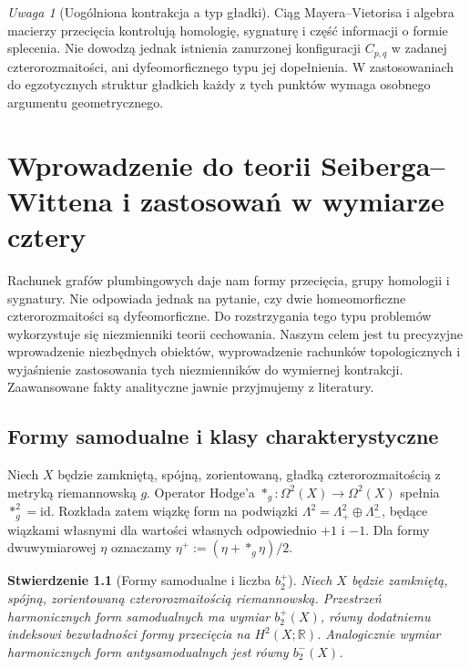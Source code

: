 \documentclass[11pt,a4paper]{report}
\numberwithin{equation}{section}
\theoremstyle{plain}
\newtheorem{stwierdzenie}[twierdzenie]{Stwierdzenie}
\theoremstyle{definition}
\theoremstyle{remark}
\newtheorem{uwaga}[twierdzenie]{Uwaga}
\begin{document}
\begin{uwaga}[Uogólniona kontrakcja a typ gładki]
Ciąg Mayera--Vietorisa i algebra macierzy przecięcia
kontrolują homologię, sygnaturę i część informacji
o formie splecenia. Nie dowodzą jednak istnienia
zanurzonej konfiguracji $C_{p,q}$ w zadanej
czterorozmaitości, ani dyfeomorficznego typu jej
dopełnienia. W zastosowaniach do egzotycznych struktur
gładkich każdy z tych punktów wymaga osobnego
argumentu geometrycznego.
\end{uwaga}

\chapter{Wprowadzenie do teorii Seiberga--Wittena i zastosowań w wymiarze cztery}
\label{ch:tg-sw}

Rachunek grafów plumbingowych daje nam formy przecięcia,
grupy homologii i sygnatury. Nie odpowiada jednak na pytanie,
czy dwie homeomorficzne czterorozmaitości są dyfeomorficzne.
Do rozstrzygania tego typu problemów wykorzystuje się
niezmienniki teorii cechowania. Naszym celem jest tu
precyzyjne wprowadzenie niezbędnych obiektów, wyprowadzenie
rachunków topologicznych i wyjaśnienie zastosowania tych
niezmienników do wymiernej kontrakcji. Zaawansowane
fakty analityczne jawnie przyjmujemy z literatury.

\section{Formy samodualne i klasy charakterystyczne}
\label{sec:tg-sw-selfdual}

Niech $X$ będzie zamkniętą, spójną, zorientowaną,
gładką czterorozmaitością z metryką riemannowską $g$.
Operator Hodge'a $*_g:\Omega^2(X)\to\Omega^2(X)$ spełnia
$*_g^2=\mathrm{id}$. Rozkłada zatem wiązkę form na podwiązki
$\Lambda^2=\Lambda^2_+\oplus\Lambda^2_-$, będące wiązkami
własnymi dla wartości własnych odpowiednio $+1$ i $-1$.
Dla formy dwuwymiarowej $\eta$ oznaczamy
$\eta^+:=(\eta+*_g\eta)/2$.

\begin{stwierdzenie}[Formy samodualne i liczba $b_2^+$]
Niech $X$ będzie zamkniętą, spójną, zorientowaną
czterorozmaitością riemannowską. Przestrzeń harmonicznych
form samodualnych ma wymiar $b_2^+(X)$, równy dodatniemu
indeksowi bezwładności formy przecięcia na $H^2(X;\mathbb R)$.
Analogicznie wymiar harmonicznych form antysamodualnych
jest równy $b_2^-(X)$.
\end{stwierdzenie}
\end{document}
